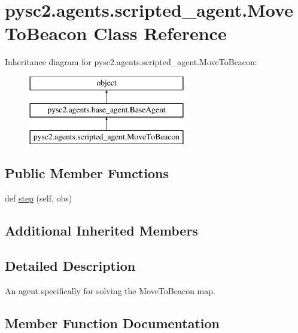 \hypertarget{classpysc2_1_1agents_1_1scripted__agent_1_1_move_to_beacon}{}\section{pysc2.\+agents.\+scripted\+\_\+agent.\+Move\+To\+Beacon Class Reference}
\label{classpysc2_1_1agents_1_1scripted__agent_1_1_move_to_beacon}
Inheritance diagram for pysc2.\+agents.\+scripted\+\_\+agent.\+Move\+To\+Beacon\+:\begin{figure}[H]
\begin{center}
\leavevmode
\includegraphics[height=3.000000cm]{classpysc2_1_1agents_1_1scripted__agent_1_1_move_to_beacon}
\end{center}
\end{figure}
\subsection*{Public Member Functions}
\begin{DoxyCompactItemize}
\item 
def \mbox{\hyperlink{classpysc2_1_1agents_1_1scripted__agent_1_1_move_to_beacon_a4406bec055e5e0d8e7dccac7fc2abf83}{step}} (self, obs)
\end{DoxyCompactItemize}
\subsection*{Additional Inherited Members}


\subsection{Detailed Description}
\begin{DoxyVerb}An agent specifically for solving the MoveToBeacon map.\end{DoxyVerb}
 

\subsection{Member Function Documentation}
\mbox{\label{classpysc2_1_1agents_1_1scripted__agent_1_1_move_to_beacon_a4406bec055e5e0d8e7dccac7fc2abf83}} 
